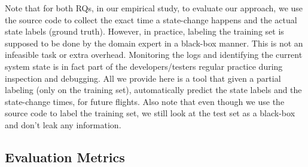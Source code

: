 Note that for both RQs, in our empirical study, to evaluate our approach, we use the source code to collect the exact time a state-change happens and the actual state labels (ground truth). However, in practice, labeling the training set is supposed to be done by the domain expert in a black-box manner. This is not an infeasible task or extra overhead. Monitoring the logs and identifying the current system state is in fact part of the developers/testers regular practice during inspection and debugging. All we provide here is a tool that given a partial labeling (only on the training set), automatically predict the state labels and the state-change times, for future flights.  Also note that even though we use the source code to label the training set, we still look at the test set as a black-box and don't leak any information.

\subsection{Evaluation Metrics}
